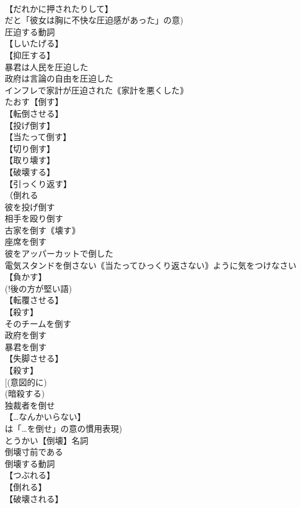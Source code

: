 \documentclass[8pt]{extreport}
\begin{document}
\begin{CJK}{UTF8}{min}
\\	【だれかに押されたりして】
\\	だと「彼女は胸に不快な圧迫感があった」の意)
\\	圧迫する動詞
\\	【しいたげる】
\\	【抑圧する】
\\	暴君は人民を圧迫した
\\	政府は言論の自由を圧迫した
\\	インフレで家計が圧迫された｟家計を悪くした｠
\\	たおす【倒す】
\\	【転倒させる】
\\	【投げ倒す】
\\	【当たって倒す】
\\	【切り倒す】
\\	【取り壊す】
\\	【破壊する】
\\	【引っくり返す】
\\	（倒れる
\\	彼を投げ倒す
\\	相手を殴り倒す
\\	古家を倒す｟壊す｠
\\	座席を倒す
\\	彼をアッパーカットで倒した
\\	電気スタンドを倒さない｟当たってひっくり返さない｠ように気をつけなさい
\\	【負かす】
\\	(!後の方が堅い語) 
\\	【転覆させる】
\\	【殺す】
\\	そのチームを倒す
\\	政府を倒す
\\	暴君を倒す
\\	【失脚させる】
\\	【殺す】
\\	[(意図的に) 
\\	(暗殺する) 
\\	独裁者を倒せ
\\	【…なんかいらない】
\\	は「…を倒せ」の意の慣用表現)
\\	とうかい【倒壊】名詞
\\	倒壊寸前である
\\	倒壊する動詞
\\	【つぶれる】
\\	【倒れる】
\\	【破壊される】

\end{CJK}
\end{document}
